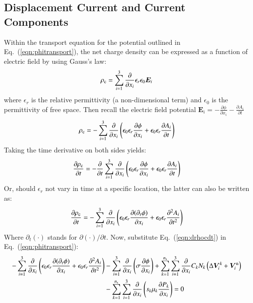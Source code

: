 \documentclass{warpdoc}
\newcommand{\alb}{\vspace{0.2cm}\\} %
\newcommand{\ns}{{n_{\rm s}}}
\renewcommand{\vec}[1]{\bm{#1}}
\begin{document}
\subsection{Displacement Current and Current Components}

Within the transport equation for the potential outlined in Eq.\ (\ref{eqn:phitransport}), the net charge density can be expressed as a function of electric field by using Gauss's law:
%
\begin{equation}
  \rho_{\rm c} =  \sum_{i=1}^3 \frac{\partial }{\partial x_i} \epsilon_r \epsilon_0 \vec{E}_i
\end{equation}
%
where $\epsilon_r$ is the relative permittivity (a non-dimensional term) and $\epsilon_0$ is the permittivity of free space. Then recall the electric field potential $\vec{E}_i = -\frac{\partial \phi}{\partial x_i} -\frac{\partial A_i}{\partial t}$
%
\begin{equation}
  \rho_{\rm c} = - \sum_{i=1}^3 \frac{\partial }{\partial x_i}
  \left(\epsilon_0 \epsilon_r \frac{\partial \phi}{\partial x_i}
       +\epsilon_0 \epsilon_r \frac{\partial A_i}{\partial t} \right)
\end{equation}
%
Taking the time derivative on both sides yields:
%
\begin{equation}
  \frac{\partial \rho_{\rm c}}{\partial t} = - \frac{\partial }{\partial t}\sum_{i=1}^3 \frac{\partial }{\partial x_i}\left(\epsilon_0 \epsilon_r \frac{\partial \phi}{\partial x_i} 
            +\epsilon_0 \epsilon_r \frac{\partial A_i}{\partial t} \right)
\end{equation}
%
Or, should $\epsilon_r$ not vary in time at a specific location, the latter can also be written as:
%
\begin{equation}
  \frac{\partial \rho_{\rm c}}{\partial t} = - \sum_{i=1}^3 \frac{\partial }{\partial x_i}\left(\epsilon_0   \epsilon_r \frac{\partial (\partial_t \phi)}{\partial x_i} 
  +\epsilon_0 \epsilon_r \frac{\partial^2 A_i}{\partial t^2}\right)
\label{eqn:drhocdt}
\end{equation}
%
Where $\partial_t(\cdot)$ stands for $\partial (\cdot)/\partial t$.  Now, substitute Eq.\ (\ref{eqn:drhocdt}) in Eq.\ (\ref{eqn:phitransport}):
%
\begin{align}
- \sum_{i=1}^3 \frac{\partial }{\partial x_i}\left(\epsilon_0 \epsilon_r \frac{\partial (\partial_t \phi)}{\partial x_i} +\epsilon_0 \epsilon_r \frac{\partial^2 A_i}{\partial t^2}\right)
&- \sum_{i=1}^3 \frac{\partial}{\partial x_i}\left( \sigma  \frac{\partial \phi}{\partial x_i}   \right)
+ \sum_{k=1}^\ns\sum_{i=1}^3 \frac{\partial}{\partial x_i} C_k N_k \left(\Delta \vec{V}^k_i+\vec{V}^{\rm n}_i \right) \nonumber\alb
&- \sum_{k=1}^\ns\sum_{i=1}^3 \frac{\partial}{\partial x_i}  \left({s_k \mu_k} \frac{\partial P_k}{\partial x_i} \right) 
= 0
\end{align}
\end{document}
